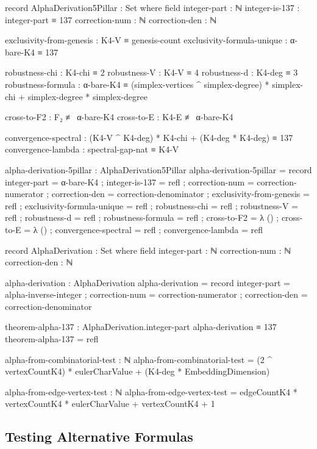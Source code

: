 \documentclass[11pt,a4paper]{book}
\begin{document}
\begin{code}
record AlphaDerivation5Pillar : Set where
  field
    integer-part     : ℕ
    integer-is-137   : integer-part ≡ 137
    correction-num   : ℕ
    correction-den   : ℕ
    
    exclusivity-from-genesis : K4-V ≡ genesis-count
    exclusivity-formula-unique : α-bare-K4 ≡ 137
    
    robustness-chi : K4-chi ≡ 2
    robustness-V : K4-V ≡ 4
    robustness-d : K4-deg ≡ 3
    robustness-formula : α-bare-K4 ≡ (simplex-vertices ^ simplex-degree) * simplex-chi + simplex-degree * simplex-degree
    
    cross-to-F2 : F₂ ≢ α-bare-K4
    cross-to-E : K4-E ≢ α-bare-K4
    
    convergence-spectral : (K4-V ^ K4-deg) * K4-chi + (K4-deg * K4-deg) ≡ 137
    convergence-lambda : spectral-gap-nat ≡ K4-V

alpha-derivation-5pillar : AlphaDerivation5Pillar
alpha-derivation-5pillar = record
  { integer-part   = α-bare-K4
  ; integer-is-137 = refl
  ; correction-num = correction-numerator
  ; correction-den = correction-denominator
  ; exclusivity-from-genesis = refl
  ; exclusivity-formula-unique = refl
  ; robustness-chi = refl
  ; robustness-V = refl
  ; robustness-d = refl
  ; robustness-formula = refl
  ; cross-to-F2 = λ ()
  ; cross-to-E = λ ()
  ; convergence-spectral = refl
  ; convergence-lambda = refl
  }

record AlphaDerivation : Set where
  field
    integer-part     : ℕ
    correction-num   : ℕ
    correction-den   : ℕ

alpha-derivation : AlphaDerivation
alpha-derivation = record
  { integer-part   = alpha-inverse-integer
  ; correction-num = correction-numerator
  ; correction-den = correction-denominator
  }

theorem-alpha-137 : AlphaDerivation.integer-part alpha-derivation ≡ 137
theorem-alpha-137 = refl

alpha-from-combinatorial-test : ℕ
alpha-from-combinatorial-test = (2 ^ vertexCountK4) * eulerCharValue + (K4-deg * EmbeddingDimension)

alpha-from-edge-vertex-test : ℕ
alpha-from-edge-vertex-test = edgeCountK4 * vertexCountK4 * eulerCharValue + vertexCountK4 + 1
\end{code}

\subsection{Testing Alternative Formulas}
\end{document}
